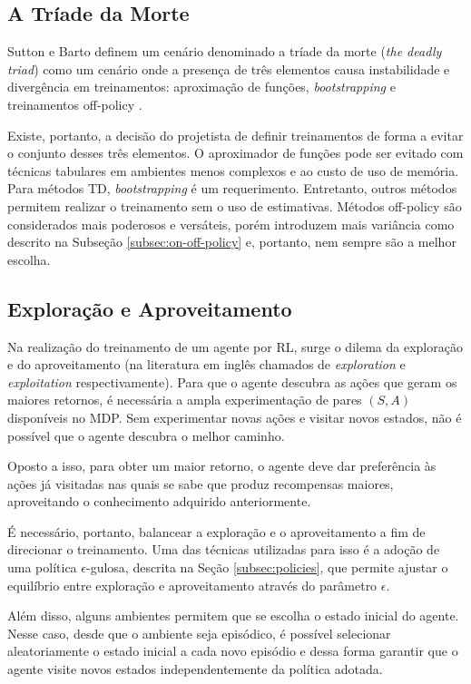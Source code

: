 \subsection{A Tríade da Morte}

Sutton e Barto definem um cenário denominado a tríade da morte (\textit{the deadly triad}) como um cenário onde a presença de três elementos causa instabilidade e divergência em treinamentos: aproximação de funções, \textit{bootstrapping} e treinamentos off-policy \cite{sutton2018reinforcement}.

Existe, portanto, a decisão do projetista de definir treinamentos de forma a evitar o conjunto desses três elementos. O aproximador de funções pode ser evitado com técnicas tabulares em ambientes menos complexos e ao custo de uso de memória. Para métodos TD, \textit{bootstrapping} é um requerimento. Entretanto, outros métodos permitem realizar o treinamento sem o uso de estimativas. Métodos off-policy são considerados mais poderosos e versáteis, porém introduzem mais variância como descrito na Subseção \ref{subsec:on-off-policy} e, portanto, nem sempre são a melhor escolha.

\subsection{Exploração e Aproveitamento}
\label{subsec:exploration-exploitation}

Na realização do treinamento de um agente por RL, surge o dilema da exploração e do aproveitamento (na literatura em inglês chamados de \textit{exploration} e \textit{exploitation} respectivamente). Para que o agente descubra as ações que geram os maiores retornos, é necessária a ampla experimentação de pares $(S,A)$ disponíveis no MDP. Sem experimentar novas ações e visitar novos estados, não é possível que o agente descubra o melhor caminho.

Oposto a isso, para obter um maior retorno, o agente deve dar preferência às ações já visitadas nas quais se sabe que produz recompensas maiores, aproveitando o conhecimento adquirido anteriormente.

É necessário, portanto, balancear a exploração e o aproveitamento a fim de direcionar o treinamento. Uma das técnicas utilizadas para isso é a adoção de uma política $\epsilon$-gulosa, descrita na Seção \ref{subsec:policies}, que permite ajustar o equilíbrio entre exploração e aproveitamento através do parâmetro $\epsilon$.

Além disso, alguns ambientes permitem que se escolha o estado inicial do agente. Nesse caso, desde que o ambiente seja episódico, é possível selecionar aleatoriamente o estado inicial a cada novo episódio e dessa forma garantir que o agente visite novos estados independentemente da política adotada.

